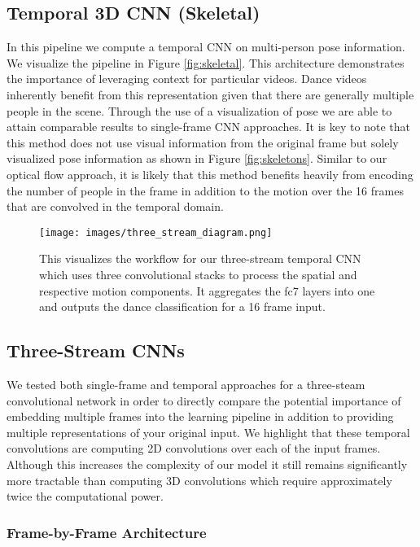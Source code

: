 \documentclass[10pt,twocolumn,letterpaper]{article}
\begin{document}
\subsection{Temporal 3D CNN (Skeletal)} In this pipeline we compute a temporal CNN on multi-person pose information. We visualize the pipeline in Figure \ref{fig:skeletal}. This architecture demonstrates the importance of leveraging context for particular videos. Dance videos inherently benefit from this representation given that there are generally multiple people in the scene. Through the use of a visualization of pose we are able to attain comparable results to single-frame CNN approaches. It is key to note that this method does not use visual information from the original frame but solely visualized pose information as shown in Figure \ref{fig:skeletons}. Similar to our optical flow approach, it is likely that this method benefits heavily from encoding the number of people in the frame in addition to the motion over the 16 frames that are convolved in the temporal domain.

\begin{figure*}[t]
\centering
\texttt{[image: images/three\_stream\_diagram.png]}
\caption{This visualizes the workflow for our three-stream temporal CNN which uses three convolutional stacks to process the spatial and respective motion components. It aggregates the fc7 layers into one and outputs the dance classification for a 16 frame input.}
\label{fig:final}
\end{figure*}

\subsection{Three-Stream CNNs}

We tested both single-frame and temporal approaches for a three-steam convolutional network in order to directly compare the potential importance of embedding multiple frames into the learning pipeline in addition to providing multiple representations of your original input. We highlight that these temporal convolutions are computing 2D convolutions over each of the input frames. Although this increases the complexity of our model it still remains significantly more tractable than computing 3D convolutions which require approximately twice the computational power.

\subsubsection{Frame-by-Frame Architecture}
\end{document}
